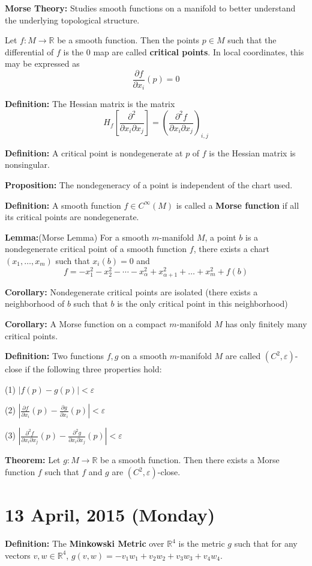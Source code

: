 \documentclass{article}
\begin{document}
\textbf{Morse Theory:} Studies smooth functions on a manifold to better understand the underlying topological structure.

Let $f: M \to \mathbb{R}$ be a smooth function. Then the points $p \in M$ such that the differential of $f$ is the 0 map are called \textbf{critical points}. In local coordinates, this may be expressed as
\[
\frac{\partial f}{\partial x_i}(p) = 0
\]

\textbf{Definition:} The Hessian matrix is the matrix
\[
H_f \left[\frac{\partial^2}{\partial x_i \partial x_j} \right] = \left(\frac{\partial^2f}{\partial x_i \partial x_j} \right)_{i,j}
\]

\textbf{Definition:} A critical point is nondegenerate at $p$ of $f$ is the Hessian matrix is nonsingular.

\textbf{Proposition:} The nondegeneracy of a point is independent of the chart used.

\textbf{Definition:} A smooth function $f \in C^\infty(M)$ is called a \textbf{Morse function} if all its critical points are nondegenerate.

\textbf{Lemma:}(Morse Lemma) For a smooth $m$-manifold $M$, a point $b$ is a nondegenerate critical point of a smooth function $f$, there exists a chart $(x_1, \ldots, x_m)$ such that $x_i(b) = 0$ and
\[
f = -x_1^2 - x_2^2 - \cdots - x_\alpha^2 + x_{\alpha + 1}^2 + \ldots + x_m^2 + f(b)
\]

\textbf{Corollary:} Nondegenerate critical points are isolated (there exists a neighborhood of $b$ such that $b$ is the only critical point in this neighborhood)

\textbf{Corollary:} A Morse function on a compact $m$-manifold $M$ has only finitely many critical points.

\textbf{Definition:} Two functions $f,g$ on a smooth $m$-manifold $M$ are called $(C^2, \varepsilon)$-close if the following three properties hold:

(1) $|f(p) - g(p) | < \varepsilon$

(2) $|\frac{\partial f}{\partial x_i}(p) - \frac{\partial g}{\partial x_i}(p)| < \varepsilon$

(3) $|\frac{\partial^2 f}{\partial x_i \partial x_j}(p) - \frac{\partial^2 g}{\partial x_i \partial x_j}(p)| < \varepsilon$

\textbf{Theorem:} Let $g: M \to \mathbb{R}$ be a smooth function. Then there exists a Morse function $f$ such that $f$ and $g$ are $(C^2,\varepsilon)$-close.

\section{13 April, 2015 (Monday)}
\textbf{Definition:} The \textbf{Minkowski Metric} over $\mathbb{R}^4$ is the metric $g$ such that for any vectors $v,w \in \mathbb{R}^4$, $g(v,w) = -v_1w_1 + v_2w_2 + v_3w_3 + v_4w_4$.
\end{document}
